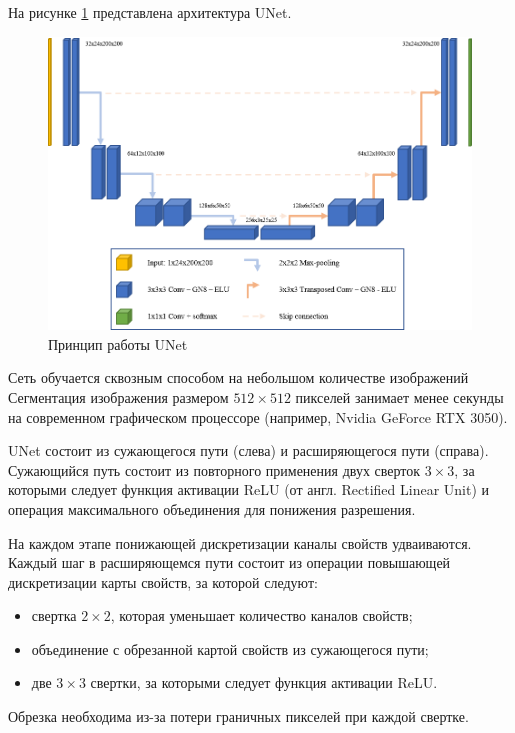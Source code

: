 На рисунке \ref{fig:unet} представлена архитектура UNet.

\begin{figure}[H]
	\centering
	\includegraphics[width=\textwidth]{img/unet.png}
	\caption{Принцип работы UNet}
	\label{fig:unet}
\end{figure}

Сеть обучается сквозным способом на небольшом количестве изображений Сегментация изображения размером $512 \times 512$ пикселей занимает менее секунды на современном графическом процессоре (например, Nvidia GeForce RTX 3050).

UNet состоит из сужающегося пути (слева) и расширяющегося пути (справа). Сужающийся путь состоит из повторного применения двух сверток $3 \times 3$, за которыми следует функция активации ReLU (от англ. Rectified Linear Unit) и операция максимального объединения для понижения разрешения.

На каждом этапе понижающей дискретизации каналы свойств удваиваются. Каждый шаг в расширяющемся пути состоит из операции повышающей дискретизации карты свойств, за которой следуют:
\begin{itemize}
	\item свертка $2 \times 2$, которая уменьшает количество каналов свойств;
	\item объединение с обрезанной картой свойств из сужающегося пути;
	\item две $3 \times 3$ свертки, за которыми следует функция активации ReLU.
\end{itemize}

Обрезка необходима из-за потери граничных пикселей при каждой свертке.

